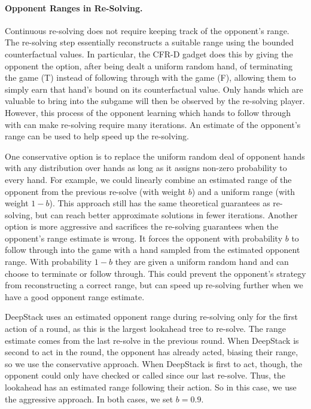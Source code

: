 \paragraph*{Opponent Ranges in Re-Solving.}
Continuous re-solving does not require keeping track of the opponent's range.  The re-solving step essentially reconstructs a suitable range using the bounded counterfactual values.  In particular, the CFR-D gadget does this by giving the opponent the option, after being dealt a uniform random hand, of terminating the game (T) instead of following through with the game (F), allowing them to simply earn that hand's bound on its counterfactual value.  Only hands which are valuable to bring into the subgame will then be observed by the re-solving player.  However, this process of the opponent learning which hands to follow through with can make re-solving require many iterations.  An estimate of the opponent's range can be used to help speed up the re-solving.

One conservative option is to replace the uniform random deal of opponent hands with any distribution over hands as long as it assigns non-zero probability to every hand.  For example, we could linearly combine an estimated range of the opponent from the previous re-solve (with weight $b$) and a uniform range (with weight $1-b$).  This approach still has the same theoretical guarantees as re-solving, but can reach better approximate solutions in fewer iterations.  Another option is more aggressive and sacrifices the re-solving guarantees when the opponent's range estimate is wrong.  It forces the opponent with probability $b$ to follow through into the game with a hand sampled from the estimated opponent range.  With probability $1-b$ they are given a uniform random hand and can choose to terminate or follow through.  This could prevent the opponent's strategy from reconstructing a correct range, but can speed up re-solving further when we have a good opponent range estimate.

DeepStack uses an estimated opponent range during re-solving only for the first action of a round, as this is the largest lookahead tree to re-solve.  The range estimate comes from the last re-solve in the previous round.  When DeepStack is second to act in the round, the opponent has already acted, biasing their range, so we use the conservative approach.  When DeepStack is first to act, though, the opponent could only have checked or called since our last re-solve.  Thus, the lookahead has an estimated range following their action.  So in this case, we use the aggressive approach.  In both cases, we set $b=0.9$.
 
